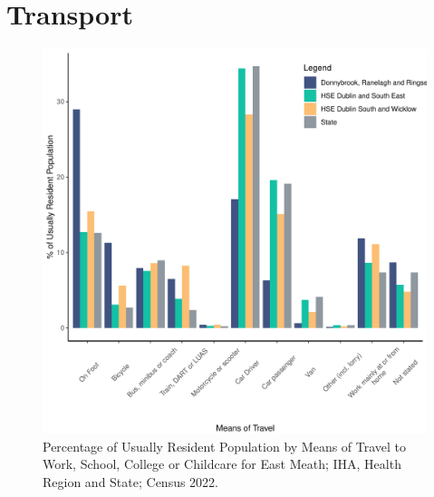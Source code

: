 \documentclass{article}
\begin{document}
\section{Transport}\label{sect:Trans}
\begin{figure}[H]
	\centering
	\includegraphics[width = 120mm]{../figures/TravelED.pdf}
	\caption{Percentage of Usually Resident Population by Means of Travel to Work, School, College or Childcare for East Meath; IHA, Health Region and State; Census 2022.}
	\label{fig:vbnv}
	\end{figure}
\end{document}

